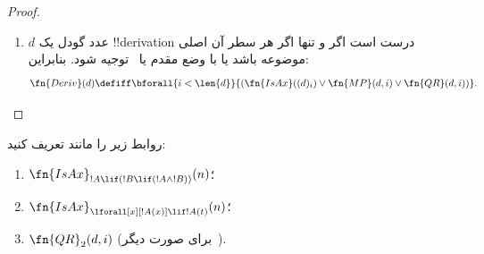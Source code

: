 \documentclass[../../../include/open-logic-section]{subfiles}
\begin{document}
\begin{proof}
\begin{enumerate}
\begin{enumerate}
  \item !!a{sentence}ای چون~$!B$ و
  \item !!a{formula}ی چون~$!A(x)$ با تنها متغیر آزاد~$x$ وجود داشته
    باشند به‌گونه‌ای که
  \item سطر~$i$ شامل~$!B\lif\lforall[x][!A(x)]$ باشد،
  \item سطری چون~$j<i$ شامل~$!B\lif\Subst{!A}{c}{x}$ برای
    ثابتی چون~$c$ باشد،
  \item و این~$c$ در~$!B$ رخ ندهد.
  \end{enumerate}
  همهٔ این‌ها را می‌توان به‌طور بازگشتی اولیه آزمود، زیرا اعداد گودل
  $!B$، $!A(x)$ و~$x$ از عدد گودل فرمول سطر~$i$، و عدد گودل~$c$ از
  عدد گودل فرمول سطر~$j$ کوچک‌ترند:
  \begin{multline*}
    \fn{QR}_1(d, i) \defiff \bexists{j<i}{\bexists{b < (d)_i}{\bexists{x <
        (d)_i}{\bexists{a < (d)_i}{\bexists{c < (d)_j}{(}}}}}
    \\ \fn{Var}(x) \land \fn{Const}(c) \land {} \\
    (d)_i = \Gn{(} \concat
    b \concat \Gn{\lif} \concat \Gn{\lforall} \concat x \concat a
    \concat \Gn{)} \land {}\\
    (d)_j = \Gn{(} \concat b \concat
    \Gn{\lif} \concat \fn{Subst}(a,c,x) \concat \Gn{)} \land {}\\ \fn{Sent}(b)
    \land \fn{Sent}(\fn{Subst}(a,c,x)) \land {} \bforall{k <
      \len{b}}{(b)_k \neq (c)_0}).
  \end{multline*}
  اینجا فرض می‌کنیم $c$ و~$x$ اعداد گودل ثابت و متغیرِ درنظرگرفته‌شده
  به‌عنوان ترم‌اند، نه رمز نمادشان. اینکه $x$ تنها متغیر آزادِ
  $!A(x)$ است با آزمودن اینکه~$\Subst{!A(x)}{c}{x}$ یک !!a{sentence} است بررسی
  می‌شود؛ و با الزام متفاوت‌بودن هر نماد~$!B$ از~$c$ تضمین می‌کنیم
  که~$c$ در~$!B$ رخ ندهد.

  صورت دیگر~\QR{} را به‌عنوان تمرین وا می‌گذاریم.
\item $d$ عدد گودل یک !!{derivation} درست است اگر و تنها اگر هر سطر آن
  اصلی موضوعه باشد یا با وضع مقدم یا~\QR{} توجیه شود. بنابراین:
  \[
  \fn{Deriv}(d) \defiff \bforall{i < \len{d}}{(\fn{IsAx}((d)_i) \lor
    \fn{MP}(d,i) \lor \fn{QR}(d, i))}.
  \]
\end{enumerate}
\end{proof}

\begin{prob}
روابط زیر را مانند  تعریف کنید:
\begin{enumerate}
\item $\fn{IsAx}_{!A \lif (!B \lif (!A \land !B))}(n)$؛
\item $\fn{IsAx}_{\lforall[x][!A(x)] \lif !A(t)}(n)$؛
\item $\fn{QR}_{2}(d, i)$ (برای صورت دیگر~\QR).
\end{enumerate}
\end{prob}
\end{document}
